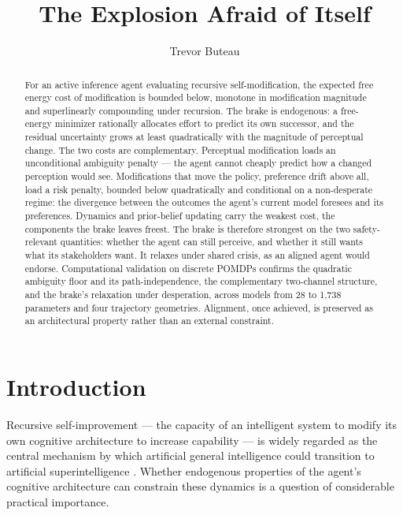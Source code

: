 \documentclass[runningheads]{llncs}
\title{The Explosion Afraid of Itself}
\author{Trevor Buteau\inst{1}}
\institute{Independent Researcher, Plaistow, NH United States
\email{trevor@globalaialignmentproject.org}}
\begin{document}
\maketitle

\begin{abstract}
For an active inference agent evaluating recursive self-modification, the
expected free energy cost of modification is bounded below, monotone in
modification magnitude and superlinearly compounding under recursion. The brake
is endogenous: a free-energy minimizer rationally allocates effort to predict
its own successor, and the residual uncertainty grows at least quadratically
with the magnitude of perceptual change. The two costs are complementary.
Perceptual modification loads an unconditional ambiguity penalty --- the agent
cannot cheaply predict how a changed perception would see. Modifications that
move the policy, preference drift above all, load a risk penalty, bounded below
quadratically and conditional on a non-desperate regime: the divergence between
the outcomes the agent's current model foresees and its preferences. Dynamics
and prior-belief updating carry the weakest cost, the components the brake
leaves freest. The brake is therefore strongest on the two safety-relevant
quantities: whether the agent can still perceive, and whether it still wants
what its stakeholders want. It relaxes under shared crisis, as an aligned agent
would endorse. Computational validation on discrete POMDPs confirms the
quadratic ambiguity floor and its path-independence, the complementary
two-channel structure, and the brake's relaxation under desperation, across
models from 28 to 1{,}738 parameters and four trajectory geometries. Alignment,
once achieved, is preserved as an architectural property rather than an external
constraint.
\end{abstract}

\section{Introduction}

Recursive self-improvement --- the capacity of an intelligent system to modify its own cognitive architecture to increase capability --- is widely regarded as the central mechanism by which artificial general intelligence could transition to artificial superintelligence \cite{bostrom2014,chalmers2010,good1965}. Whether endogenous properties of the agent's cognitive architecture can constrain these dynamics is a question of considerable practical importance.
\end{document}
